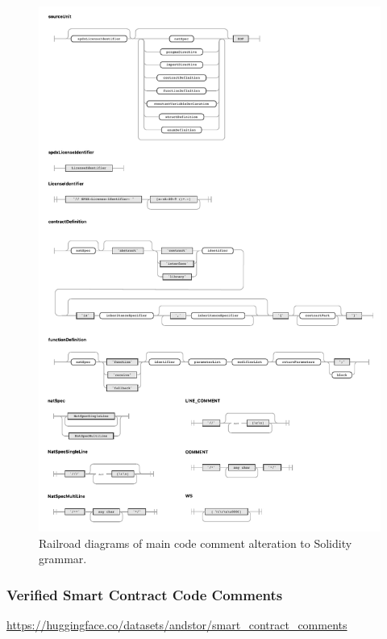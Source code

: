 \begin{figure}[htbp]
    \centering
    \includegraphics[width=\textwidth]{figures/solidity-comments-railroad-diagram.pdf}
    \caption{Railroad diagrams of main code comment alteration to Solidity grammar.}
    \label{fig:solidity-railroad-diagram}
\end{figure}


\subsubsection{Verified Smart Contract Code Comments}
\label{sec:verified-smart-contract-code-comments}
\url{https://huggingface.co/datasets/andstor/smart_contract_comments}

